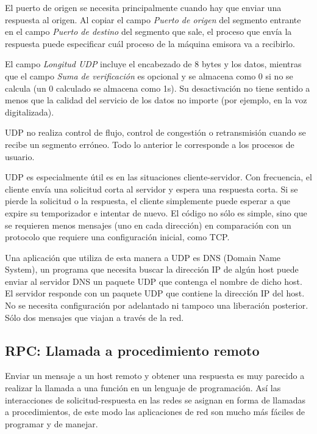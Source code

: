 \documentclass[10pt,a4paper]{report}
\begin{document}
	\par El puerto de origen se necesita principalmente cuando hay que enviar una respuesta al origen. Al copiar el campo \textit{Puerto de origen} del segmento entrante en el campo \textit{Puerto de destino} del segmento que sale, el proceso que envía la respuesta puede especificar cuál proceso de la máquina emisora va a recibirlo.

	\par El campo \textit{Longitud UDP} incluye el encabezado de 8 bytes y los datos, mientras que el campo \textit{Suma de verificación} es opcional y se almacena como 0 si no se calcula (un 0 calculado se almacena como 1s). Su desactivación no tiene sentido a menos que la calidad del servicio de los datos no importe (por ejemplo, en la voz digitalizada).
	
	\par UDP no realiza control de flujo, control de congestión o retransmisión cuando se recibe un segmento erróneo. Todo lo anterior le corresponde a los procesos de usuario. 
	
	\par UDP es especialmente útil es en las situaciones cliente-servidor. Con frecuencia, el cliente envía una solicitud corta al servidor y espera una respuesta corta. Si se pierde la solicitud o la respuesta, el cliente simplemente puede esperar a que expire su temporizador e intentar de nuevo. El código no sólo es simple, sino que se requieren menos mensajes (uno en cada dirección) en comparación con un protocolo que requiere una configuración inicial, como TCP.

	\par Una aplicación que utiliza de esta manera a UDP es DNS (Domain Name System), un programa que necesita buscar la dirección IP de algún host puede enviar al servidor DNS un paquete UDP que contenga el nombre de dicho host. El servidor responde con un paquete UDP que contiene la dirección IP del host. No se necesita configuración por adelantado ni tampoco una liberación posterior. Sólo dos mensajes que viajan a través de la red.
	
\subsection{RPC: Llamada a procedimiento remoto}

	\par Enviar un mensaje a un host remoto y obtener una respuesta es muy parecido a realizar la llamada a una función en un lenguaje de programación. Así las interacciones de solicitud-respuesta en las redes se asignan en forma de llamadas a procedimientos, de este modo las aplicaciones de red son mucho más fáciles de programar y de manejar.
	
\end{document}

